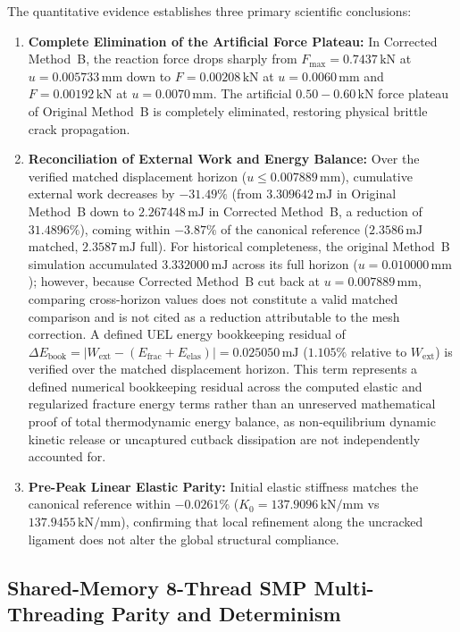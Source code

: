 The quantitative evidence establishes three primary scientific conclusions:
\begin{enumerate}
  \item \textbf{Complete Elimination of the Artificial Force Plateau:} In Corrected Method~B, the reaction force drops sharply from $F_{\max} = 0.7437\,\mathrm{kN}$ at $u = 0.005733\,\mathrm{mm}$ down to $F = 0.00208\,\mathrm{kN}$ at $u = 0.0060\,\mathrm{mm}$ and $F = 0.00192\,\mathrm{kN}$ at $u = 0.0070\,\mathrm{mm}$. The artificial $0.50 - 0.60\,\mathrm{kN}$ force plateau of Original Method~B is completely eliminated, restoring physical brittle crack propagation.
  \item \textbf{Reconciliation of External Work and Energy Balance:} Over the verified matched displacement horizon ($u \le 0.007889\,\mathrm{mm}$), cumulative external work decreases by $-31.49\%$ (from $3.309642\,\mathrm{mJ}$ in Original Method~B down to $2.267448\,\mathrm{mJ}$ in Corrected Method~B, a reduction of $31.4896\%$), coming within $-3.87\%$ of the canonical reference ($2.3586\,\mathrm{mJ}$ matched, $2.3587\,\mathrm{mJ}$ full). For historical completeness, the original Method~B simulation accumulated $3.332000\,\mathrm{mJ}$ across its full horizon ($u = 0.010000\,\mathrm{mm}$); however, because Corrected Method~B cut back at $u = 0.007889\,\mathrm{mm}$, comparing cross-horizon values does not constitute a valid matched comparison and is not cited as a reduction attributable to the mesh correction. A defined UEL energy bookkeeping residual of $\Delta E_{\mathrm{book}} = |W_{\mathrm{ext}} - (E_{\mathrm{frac}} + E_{\mathrm{elas}})| = 0.025050\,\mathrm{mJ}$ ($1.105\%$ relative to $W_{\mathrm{ext}}$) is verified over the matched displacement horizon. This term represents a defined numerical bookkeeping residual across the computed elastic and regularized fracture energy terms rather than an unreserved mathematical proof of total thermodynamic energy balance, as non-equilibrium dynamic kinetic release or uncaptured cutback dissipation are not independently accounted for.
  \item \textbf{Pre-Peak Linear Elastic Parity:} Initial elastic stiffness matches the canonical reference within $-0.0261\%$ ($K_0 = 137.9096\,\mathrm{kN/mm}$ vs $137.9455\,\mathrm{kN/mm}$), confirming that local refinement along the uncracked ligament does not alter the global structural compliance.
\end{enumerate}


\subsection{Shared-Memory 8-Thread SMP Multi-Threading Parity and Determinism}
\label{subsec:method_b_8t_smp_parity}

